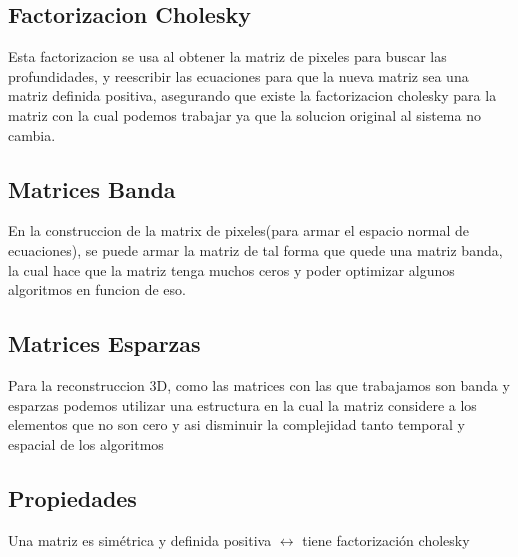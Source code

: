 \subsection{Factorizacion Cholesky}
Esta factorizacion se usa al obtener la matriz de pixeles para buscar las profundidades, y reescribir las ecuaciones para que la nueva matriz sea una matriz definida positiva, asegurando que existe la factorizacion cholesky para la matriz con la cual podemos trabajar ya que la solucion original al sistema no cambia.

\subsection{Matrices Banda}
En la construccion de la matrix de pixeles(para armar el espacio normal de ecuaciones), se puede armar la matriz de tal forma que quede una matriz banda, la cual hace que la matriz tenga muchos ceros y poder optimizar algunos algoritmos en funcion de eso.


\subsection{Matrices Esparzas}
Para la reconstruccion 3D, como las matrices con las que trabajamos son banda y esparzas podemos utilizar una estructura en la cual la matriz considere a los elementos que no son cero y asi disminuir la complejidad tanto temporal y espacial de los algoritmos 

\subsection{Propiedades}
Una matriz es sim\'etrica y definida positiva $\leftrightarrow$ tiene factorizaci\'on cholesky

